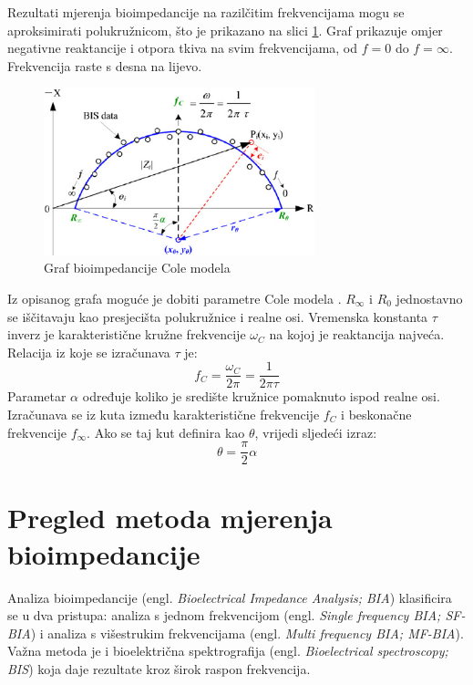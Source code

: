 \documentclass[../diplomski_rad.tex]{subfiles}
\begin{document}
Rezultati mjerenja bioimpedancije na razilčitim frekvencijama mogu se aproksimirati polukružnicom,  
što je prikazano na slici \ref{slk:cole_graf}. 
Graf prikazuje omjer negativne reaktancije i otpora tkiva na svim frekvencijama, 
od $f=0$ do $f=\infty$. Frekvencija raste s desna na lijevo. 
\begin{figure}[htb]
    \centering
    \includegraphics[width=0.7\textwidth]{Figures/cole_plot.png} 
    \caption{Graf bioimpedancije Cole modela \cite{Yang_2013}}
    \label{slk:cole_graf}
\end{figure}
Iz opisanog grafa moguće je dobiti parametre Cole modela \cite{Yang_2013}.
$R_{\infty}$ i $R_{0}$ jednostavno se iščitavaju kao presjecišta polukružnice i realne osi.
Vremenska konstanta $\tau$ inverz je karakteristične kružne frekvencije $\omega_{C}$ na kojoj je reaktancija najveća.
Relacija iz koje se izračunava $\tau$ je:
\begin{equation}
    \label{jed:cole}
    f_{C} = \frac{\omega_{C}}{2\pi} = \frac{1}{2\pi\tau} 
\end{equation} 
Parametar $\alpha$ određuje koliko je središte kružnice pomaknuto ispod realne osi. 
Izračunava se iz kuta između karakteristične frekvencije $f_{C}$ i beskonačne frekvencije $f_{\infty}$. 
Ako se taj kut definira kao $\theta$, vrijedi sljedeći izraz:
\begin{equation}
    \label{jed:cole}
    \theta = \frac{\pi}{2}\alpha 
\end{equation} 

\section{Pregled metoda mjerenja bioimpedancije}
Analiza bioimpedancije (engl. \textit{Bioelectrical Impedance Analysis; BIA}) klasificira se u dva pristupa: 
analiza s jednom frekvencijom (engl. \textit{Single frequency BIA; SF-BIA}) 
i analiza s višestrukim frekvencijama (engl. \textit{Multi frequency BIA; MF-BIA}).
Važna metoda je i bioelektrična spektrografija (engl. \textit{Bioelectrical spectroscopy; BIS}) 
koja daje rezultate kroz širok raspon frekvencija. 
\end{document}
